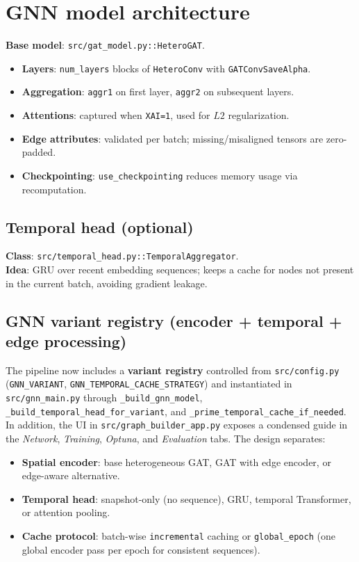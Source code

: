 \section{GNN model architecture}
\textbf{Base model}: \texttt{src/gat\_model.py::HeteroGAT}.
\begin{itemize}[leftmargin=*]
  \item \textbf{Layers}: \texttt{num\_layers} blocks of \texttt{HeteroConv} with \texttt{GATConvSaveAlpha}.
  \item \textbf{Aggregation}: \texttt{aggr1} on first layer, \texttt{aggr2} on subsequent layers.
  \item \textbf{Attentions}: captured when \texttt{XAI=1}, used for $L2$ regularization.
  \item \textbf{Edge attributes}: validated per batch; missing/misaligned tensors are zero-padded.
  \item \textbf{Checkpointing}: \texttt{use\_checkpointing} reduces memory usage via recomputation.
\end{itemize}

\subsection{Temporal head (optional)}
\textbf{Class}: \texttt{src/temporal\_head.py::TemporalAggregator}.\\
\textbf{Idea}: GRU over recent embedding sequences; keeps a cache for nodes not present in the current batch, avoiding gradient leakage.

\subsection{GNN variant registry (encoder + temporal + edge processing)}
\label{sec:gnn_variants}
The pipeline now includes a \textbf{variant registry} controlled from
\texttt{src/config.py} (\texttt{GNN\_VARIANT}, \texttt{GNN\_TEMPORAL\_CACHE\_STRATEGY})
and instantiated in \texttt{src/gnn\_main.py} through
\texttt{\_build\_gnn\_model}, \texttt{\_build\_temporal\_head\_for\_variant}, and
\texttt{\_prime\_temporal\_cache\_if\_needed}. In addition, the UI in
\texttt{src/graph\_builder\_app.py} exposes a condensed guide in the
\emph{Network}, \emph{Training}, \emph{Optuna}, and \emph{Evaluation} tabs.
The design separates:
\begin{itemize}[leftmargin=*]
  \item \textbf{Spatial encoder}: base heterogeneous GAT, GAT with edge encoder, or edge-aware alternative.
  \item \textbf{Temporal head}: snapshot-only (no sequence), GRU, temporal Transformer, or attention pooling.
  \item \textbf{Cache protocol}: batch-wise \texttt{incremental} caching or \texttt{global\_epoch} (one global encoder pass per epoch for consistent sequences).
\end{itemize}

